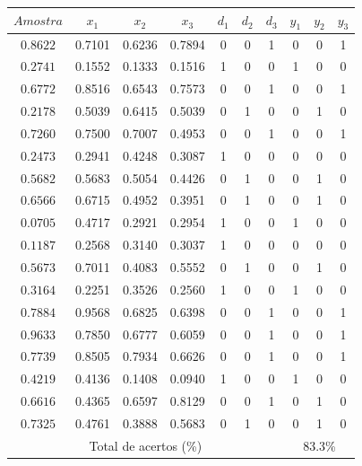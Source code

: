 \documentclass[a4paper]{article}
\begin{document}
\begin{center}
\begin{tabular}{|c|c|c|c|c|c|c|c|c|c|}
\hline
$Amostra$ & $x_1$ & $x_2$ & $x_3$ & $d_1$ & $d_2$ & $d_3$ & $y_1$ & $y_2$ & $y_3$ \\ \hline
$0.8622$ & 0.7101 & 0.6236 & 0.7894 & 0 & 0 & 1 & 0 & 0 & 1 \\ \hline
$0.2741$ & 0.1552 & 0.1333 & 0.1516 & 1 & 0 & 0 & 1 & 0 & 0 \\ \hline
$0.6772$ & 0.8516 & 0.6543 & 0.7573 & 0 & 0 & 1 & 0 & 0 & 1 \\ \hline
$0.2178$ & 0.5039 & 0.6415 & 0.5039 & 0 & 1 & 0 & 0 & 1 & 0 \\ \hline
$0.7260$ & 0.7500 & 0.7007 & 0.4953 & 0 & 0 & 1 & 0 & 0 & 1 \\ \hline
$0.2473$ & 0.2941 & 0.4248 & 0.3087 & 1 & 0 & 0 & 0 & 0 & 0 \\ \hline
$0.5682$ & 0.5683 & 0.5054 & 0.4426 & 0 & 1 & 0 & 0 & 1 & 0 \\ \hline
$0.6566$ & 0.6715 & 0.4952 & 0.3951 & 0 & 1 & 0 & 0 & 1 & 0 \\ \hline
$0.0705$ & 0.4717 & 0.2921 & 0.2954 & 1 & 0 & 0 & 1 & 0 & 0 \\ \hline
$0.1187$ & 0.2568 & 0.3140 & 0.3037 & 1 & 0 & 0 & 0 & 0 & 0 \\ \hline
$0.5673$ & 0.7011 & 0.4083 & 0.5552 & 0 & 1 & 0 & 0 & 1 & 0 \\ \hline
$0.3164$ & 0.2251 & 0.3526 & 0.2560 & 1 & 0 & 0 & 1 & 0 & 0 \\ \hline
$0.7884$ & 0.9568 & 0.6825 & 0.6398 & 0 & 0 & 1 & 0 & 0 & 1 \\ \hline
$0.9633$ & 0.7850 & 0.6777 & 0.6059 & 0 & 0 & 1 & 0 & 0 & 1 \\ \hline
$0.7739$ & 0.8505 & 0.7934 & 0.6626 & 0 & 0 & 1 & 0 & 0 & 1 \\ \hline
$0.4219$ & 0.4136 & 0.1408 & 0.0940 & 1 & 0 & 0 & 1 & 0 & 0 \\ \hline
$0.6616$ & 0.4365 & 0.6597 & 0.8129 & 0 & 0 & 1 & 0 & 1 & 0 \\ \hline
$0.7325$ & 0.4761 & 0.3888 & 0.5683 & 0 & 1 & 0 & 0 & 1 & 0 \\ \hline
\multicolumn{7}{|c|}{Total de acertos (\%)} & \multicolumn{3}{|c|}{83.3\%} \\ \hline
\end{tabular}
\end{center}
\end{document}
